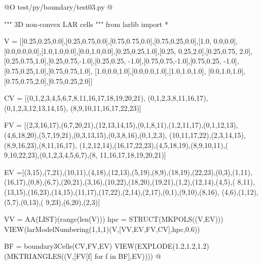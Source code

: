 \documentclass[11pt,oneside]{article}	%
\begin{document}
@O test/py/boundary/test03.py
@{""" 3D non-convex LAR cells """
from larlib import *

V = [[0.25,0.25,0.0],[0.25,0.75,0.0],[0.75,0.75,0.0],[0.75,0.25,0.0],[1.0, 0.0,0.0],
[0.0,0.0,0.0],[1.0,1.0,0.0],[0.0,1.0,0.0],[0.25,0.25,1.0],[0.25, 0.25,2.0],[0.25,0.75,
2.0],[0.25,0.75,1.0],[0.25,0.75,-1.0],[0.25,0.25, -1.0],[0.75,0.75,-1.0],[0.75,0.25,
-1.0],[0.75,0.25,1.0],[0.75,0.75,1.0], [1.0,0.0,1.0],[0.0,0.0,1.0],[1.0,1.0,1.0],
[0.0,1.0,1.0],[0.75,0.75,2.0],[0.75,0.25,2.0]]

CV = [(0,1,2,3,4,5,6,7,8,11,16,17,18,19,20,21), (0,1,2,3,8,11,16,17),
(0,1,2,3,12,13,14,15), (8,9,10,11,16,17,22,23)]

FV = [(2,3,16,17),(6,7,20,21),(12,13,14,15),(0,1,8,11),(1,2,11,17),(0,1,12,13),
(4,6,18,20),(5,7,19,21),(0,3,13,15),(0,3,8,16),(0,1,2,3),
(10,11,17,22),(2,3,14,15),(8,9,16,23),(8,11,16,17),
(1,2,12,14),(16,17,22,23),(4,5,18,19),(8,9,10,11),(
9,10,22,23),(0,1,2,3,4,5,6,7),(8, 11,16,17,18,19,20,21)]

EV =[(3,15),(7,21),(10,11),(4,18),(12,13),(5,19),(8,9),(18,19),(22,23),(0,3),(1,11),
(16,17),(0,8),(6,7),(20,21),(3,16),(10,22),(18,20),(19,21),(1,2),(12,14),(4,5),(
8,11),(13,15),(16,23),(14,15),(11,17),(17,22),(2,14),(2,17),(0,1),(9,10),(8,16),
(4,6),(1,12),(5,7),(0,13),( 9,23),(6,20),(2,3)]

VV = AA(LIST)(range(len(V)))
hpc = STRUCT(MKPOLS((V,EV)))
VIEW(larModelNumbering(1,1,1)(V,[VV,EV,FV,CV],hpc,0.6))

BF = boundary3Cells(CV,FV,EV)
VIEW(EXPLODE(1.2,1.2,1.2)(MKTRIANGLES((V,[FV[f] for f in BF],EV))))
@}
\end{document}

